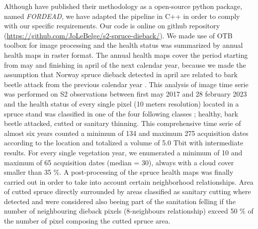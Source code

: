 \documentclass[3p,procedia]{elsarticle}
\begin{document}
Although \cite{dutrieux_package_2021} have published their methodology as a open-source python package, named \textit{FORDEAD}, we have adapted the pipeline in C++ in order to comply with our specific requirements.
Our code is online on github repository (\url{https://github.com/JoLeBelge/s2-spruce-dieback/}). 
We made use of OTB toolbox \citep{grizonnet_2017_OTB} for image processing and the health status was summarized by annual health maps in raster format.
The annual health maps cover the period starting from may and finishing in april of the next calendar year, because we made the assumption that Norway spruce dieback detected in april are related to bark beetle attack from the previous calendar year \citep{muller_features_2022}.
This analysis of image time serie was performed on S2 observations between first may 2017 and 28 february 2023 and the health status of every single pixel (10 meters resolution) located in a spruce stand was classified in one of the four following classes ; healthy, bark beetle attacked, cutted or sanitary thinning.
This comprehensive time serie of almost six years counted a minimum of 134 and maximum 275 acquisition dates according to the location and totalized a volume of 5.0 Tbit with intermediate results.
For every single vegetation year, we enumerated a minimum of 10 and maximum of 65 acquisition dates (median = 30), always with a cloud cover smaller than 35 \%.
A post-processing of the spruce health maps was finally carried out in order to take into account certain neighborhood relationships. 
Area of cutted spruce directly surrounded by areas classified as sanitary cutting where detected and were considered also beeing part of the sanitation felling if the number of neighbouring dieback pixels (8-neighbours relationship) exceed 50 \% of the number of pixel composing the cutted spruce area.
\end{document}
